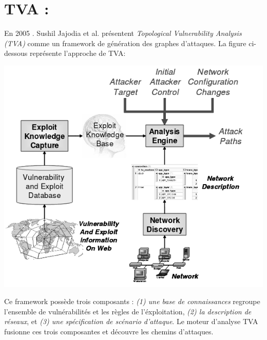 \documentclass[10pt,a4paper]{article}
\begin{document}
\section{TVA :}
En 2005 . Sushil Jajodia et al\cite{ref2}.  présentent \textit{Topological Vulnerability Analysis (TVA)} comme un framework de génération des graphes d'attaques. La figure ci-dessous représente l'approche de TVA:
\begin{center}
\includegraphics[scale=0.4]{img/TVA.png}
\end{center}
\newpage
Ce framework possède trois composants : \textit{(1) une base de connaissances} regroupe l'ensemble de vulnérabilités et les règles de l'éxploitation, \textit{(2) la description de réseaux}, et \textit{(3) une spécification de scénario d'attaque}. Le moteur d'analyse TVA fusionne ces trois composantes et découvre  les chemins d'attaques. 
\end{document}
